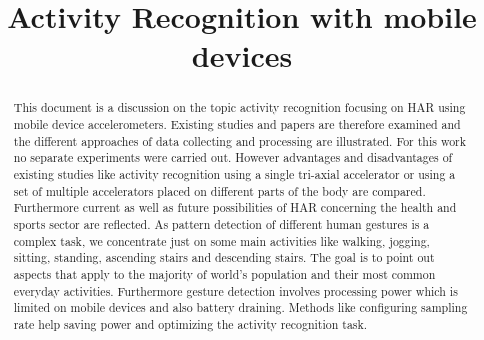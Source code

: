 \documentclass[conference]{IEEEtran}
\begin{document}
\title{Activity Recognition with mobile devices\\
}

\author{
\and
{}
\and
{}
}

\maketitle

\begin{abstract}
This document is a discussion on the topic activity recognition focusing on \ac{HAR} using mobile device accelerometers. Existing studies and papers are therefore examined and the different approaches of data collecting and processing are illustrated. For this work no separate experiments were carried out. However advantages and disadvantages of existing studies like activity recognition using a single tri-axial accelerator or using a set of multiple accelerators placed on different parts of the body are compared. Furthermore current as well as future possibilities of \ac{HAR} concerning the health and sports sector are reflected. As pattern detection of different human gestures is a complex task, we concentrate just on some main activities like walking, jogging, sitting, standing, ascending stairs and descending stairs. The goal is to point out aspects that apply to the majority of world's population and their most common everyday activities. Furthermore gesture detection involves processing power which is limited on mobile devices and also battery draining. Methods like configuring sampling rate help saving power and optimizing the activity recognition task.
\end{abstract}
\end{document}
